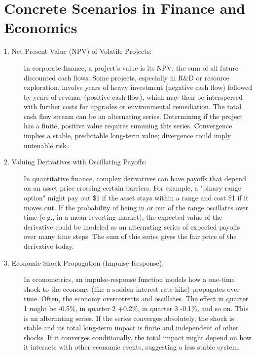 \documentclass{article}
\begin{document}
\section{Concrete Scenarios in Finance and Economics}
\begin{description}
    \item[1. Net Present Value (NPV) of Volatile Projects:] In corporate finance, a project's value is its NPV, the sum of all future discounted cash flows. Some projects, especially in R\&D or resource exploration, involve years of heavy investment (negative cash flow) followed by years of revenue (positive cash flow), which may then be interspersed with further costs for upgrades or environmental remediation. The total cash flow stream can be an alternating series. Determining if the project has a finite, positive value requires summing this series. Convergence implies a stable, predictable long-term value; divergence could imply untenable risk.
    
    \item[2. Valuing Derivatives with Oscillating Payoffs:] In quantitative finance, complex derivatives can have payoffs that depend on an asset price crossing certain barriers. For example, a "binary range option" might pay out \$1 if the asset stays within a range and cost \$1 if it moves out. If the probability of being in or out of the range oscillates over time (e.g., in a mean-reverting market), the expected value of the derivative could be modeled as an alternating series of expected payoffs over many time steps. The sum of this series gives the fair price of the derivative today.
    
    \item[3. Economic Shock Propagation (Impulse-Response):] In econometrics, an impulse-response function models how a one-time shock to the economy (like a sudden interest rate hike) propagates over time. Often, the economy overcorrects and oscillates. The effect in quarter 1 might be -0.5\%, in quarter 2 +0.2\%, in quarter 3 -0.1\%, and so on. This is an alternating series. If the series converges absolutely, the shock is stable and its total long-term impact is finite and independent of other shocks. If it converges conditionally, the total impact might depend on how it interacts with other economic events, suggesting a less stable system.
\end{description}
\end{document}

